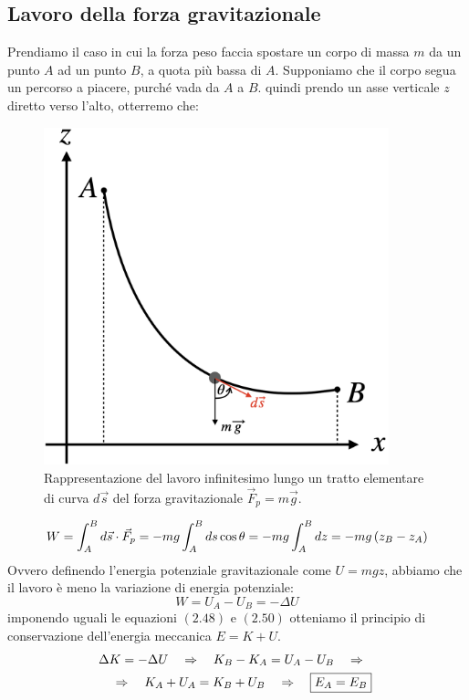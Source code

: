 \subsection{Lavoro della forza gravitazionale}
Prendiamo il caso in cui la forza peso faccia spostare un corpo di massa $m$
da un punto $A$ ad un punto $B$, a quota più bassa di $A$. Supponiamo che il corpo segua un percorso a piacere, purché vada da $A$ a $B$. quindi prendo un asse verticale $z$ diretto verso l'alto, otterremo che:
\begin{figure}[htbp]
    \begin{center}
        \includegraphics[width=10cm]{images/lavorog.png}
        \caption{Rappresentazione del lavoro infinitesimo lungo un tratto
        elementare di curva $d\vec s$ del forza gravitazionale
        $\vec F_p = m\vec g$.}
\end{center}
\label{fig:work&energy:P_work}
\end{figure}

\begin{equation}
    W = \int_A^Bd\vec s \cdot\vec F_p = -mg\int_A^Bds\cos\theta =
    -mg\int_A^Bdz = -mg\left( z_B-z_A\right)
\end{equation}
Ovvero definendo l'energia potenziale gravitazionale come $U = mgz$, abbiamo
che il lavoro è meno la variazione di energia potenziale:
\begin{equation}
    W = U_A-U_B = -\Delta U
\label{eq:work&energy:w=-du}
\end{equation}
imponendo uguali le equazioni $(2.48)$ e $(2.50)$ otteniamo il principio di
conservazione dell'energia meccanica $E = K + U$.
\begin{multline}
    \Delta K = -\Delta U\quad\Rightarrow\quad K_B-K_A = U_A -U_B\quad\Rightarrow\quad
    \\\quad\Rightarrow\quad K_A+U_A = K_B+U_B\quad\Rightarrow\quad
    \boxed{E_A = E_B}
\end{multline}
